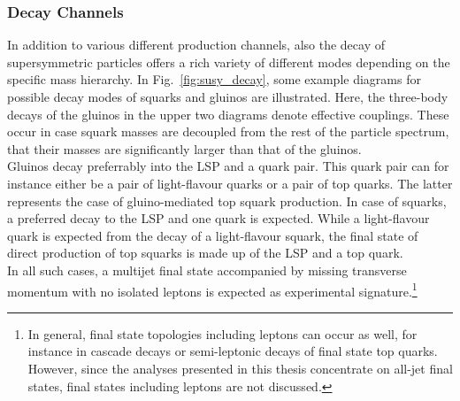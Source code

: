 \subsubsection*{Decay Channels}
\label{subsubsec:susy_decay}
In addition to various different production channels, also the decay of supersymmetric particles offers a rich variety of different modes depending on the specific mass hierarchy. In Fig.~\ref{fig:susy_decay}, some example diagrams for possible decay modes of squarks and gluinos are illustrated. Here, the three-body decays of the gluinos in the upper two diagrams denote effective couplings. These occur in case squark masses are decoupled from the rest of the particle spectrum, \ie that their masses are significantly larger than that of the gluinos. \\
Gluinos decay preferrably into the LSP and a quark pair. This quark pair can for instance either be a pair of light-flavour quarks or a pair of top quarks. The latter represents the case of gluino-mediated top squark production. In case of squarks, a preferred decay to the LSP and one quark is expected. While a light-flavour quark is expected from the decay of a light-flavour squark, the final state of direct production of top squarks is made up of the LSP and a top quark.\\
In all such cases, a multijet final state accompanied by missing transverse momentum with no isolated leptons is expected as experimental signature.\footnote{In general, final state topologies including leptons can occur as well, for instance in cascade decays or semi-leptonic decays of final state top quarks. However, since the analyses presented in this thesis concentrate on all-jet final states, final states including leptons are not discussed.}  
